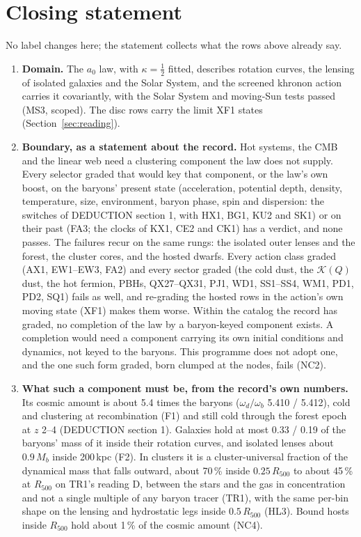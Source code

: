 \documentclass[10pt]{article}
\begin{document}
\section{Closing statement}\label{sec:closing}
No label changes here; the statement collects what the rows above already say.
\begin{enumerate}
\item \textbf{Domain.} The $a_0$ law, with $\kappa=\tfrac12$ fitted, describes rotation curves, the lensing of isolated galaxies and the Solar System, and the screened khronon action carries it covariantly, with the Solar System and moving-Sun tests passed (MS3, scoped). The disc rows carry the limit XF1 states (Section~\ref{sec:reading}).
\item \textbf{Boundary, as a statement about the record.} Hot systems, the CMB and the linear web need a clustering component the law does not supply. Every selector graded that would key that component, or the law's own boost, on the baryons' present state (acceleration, potential depth, density, temperature, size, environment, baryon phase, spin and dispersion: the switches of DEDUCTION section 1, with HX1, BG1, KU2 and SK1) or on their past (FA3; the clocks of KX1, CE2 and CK1) has a verdict, and none passes. The failures recur on the same rungs: the isolated outer lenses and the forest, the cluster cores, and the hosted dwarfs. Every action class graded (AX1, EW1--EW3, FA2) and every sector graded (the cold dust, the $\mathcal K(Q)$ dust, the hot fermion, PBHs, QX27--QX31, PJ1, WD1, SS1--SS4, WM1, PD1, PD2, SQ1) fails as well, and re-grading the hosted rows in the action's own moving state (XF1) makes them worse. Within the catalog the record has graded, no completion of the law by a baryon-keyed component exists. A completion would need a component carrying its own initial conditions and dynamics, not keyed to the baryons. This programme does not adopt one, and the one such form graded, born clumped at the nodes, fails (NC2).
\item \textbf{What such a component must be, from the record's own numbers.} Its cosmic amount is about 5.4 times the baryons ($\omega_d/\omega_b$ 5.410 / 5.412), cold and clustering at recombination (F1) and still cold through the forest epoch at $z$ 2--4 (DEDUCTION section 1). Galaxies hold at most 0.33 / 0.19 of the baryons' mass of it inside their rotation curves, and isolated lenses about $0.9\,M_b$ inside 200\,kpc (F2). In clusters it is a cluster-universal fraction of the dynamical mass that falls outward, about 70\,\% inside $0.25\,R_{500}$ to about 45\,\% at $R_{500}$ on TR1's reading D, between the stars and the gas in concentration and not a single multiple of any baryon tracer (TR1), with the same per-bin shape on the lensing and hydrostatic legs inside $0.5\,R_{500}$ (HL3). Bound hosts inside $R_{500}$ hold about 1\,\% of the cosmic amount (NC4).
\end{enumerate}
\end{document}
